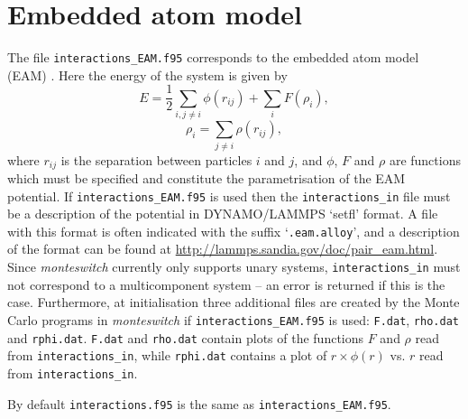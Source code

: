 \documentclass{report}
\begin{document}
\section{Embedded atom model}
The file \texttt{interactions\_EAM.f95} corresponds to the embedded atom model (EAM) \cite{Daw_1984}. Here the energy of the system 
is given by
\begin{equation}
E = \frac{1}{2}\sum_{i,j\neq i}\phi(r_{ij}) + \sum_iF(\rho_i),
\end{equation}
\begin{equation}
\rho_i=\sum_{j\neq i}\rho(r_{ij}),
\end{equation}
where $r_{ij}$ is the separation between particles $i$ and $j$, and $\phi$, $F$ and $\rho$ are functions which must be specified
and constitute the parametrisation of the EAM potential. If \texttt{interactions\_EAM.f95} is used then the \texttt{interactions\_in}
file must be a description of the potential in DYNAMO/LAMMPS `setfl' format. A file with this format is often indicated with the 
suffix `\texttt{.eam.alloy}', and a description of the format can be found at \url{http://lammps.sandia.gov/doc/pair\_eam.html}. 
Since \emph{monteswitch} currently only supports unary systems, \texttt{interactions\_in} must not correspond to a 
multicomponent system -- an error is returned if this is the case. Furthermore, at initialisation three additional files are created by the
Monte Carlo programs in \emph{monteswitch} if \texttt{interactions\_EAM.f95} is used: \texttt{F.dat}, \texttt{rho.dat} and \texttt{rphi.dat}. 
\texttt{F.dat} and \texttt{rho.dat} contain plots of the functions $F$ and $\rho$ read from \texttt{interactions\_in}, while 
\texttt{rphi.dat} contains a plot of $r\times\phi(r)$ vs. $r$ read from \texttt{interactions\_in}. 

By default \texttt{interactions.f95} is the same as \texttt{interactions\_EAM.f95}.
\end{document}

